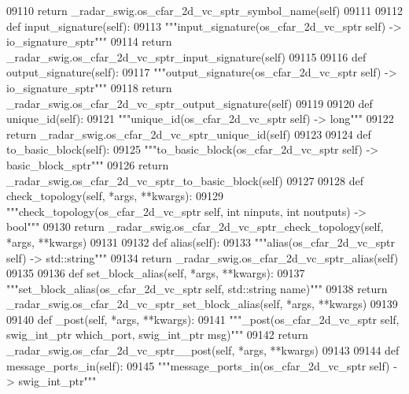 \begin{DoxyCode}
{{{{{{{{{{{{{{{{{{{{{{{{{{{{{09110         \textcolor{keywordflow}{return} \_radar\_swig.os\_cfar\_2d\_vc\_sptr\_symbol\_name(self)
09111 
09112     \textcolor{keyword}{def }input_signature(self):
09113         \textcolor{stringliteral}{"""input\_signature(os\_cfar\_2d\_vc\_sptr self) -> io\_signature\_sptr"""}
09114         \textcolor{keywordflow}{return} \_radar\_swig.os\_cfar\_2d\_vc\_sptr\_input\_signature(self)
09115 
09116     \textcolor{keyword}{def }output_signature(self):
09117         \textcolor{stringliteral}{"""output\_signature(os\_cfar\_2d\_vc\_sptr self) -> io\_signature\_sptr"""}
09118         \textcolor{keywordflow}{return} \_radar\_swig.os\_cfar\_2d\_vc\_sptr\_output\_signature(self)
09119 
09120     \textcolor{keyword}{def }unique_id(self):
09121         \textcolor{stringliteral}{"""unique\_id(os\_cfar\_2d\_vc\_sptr self) -> long"""}
09122         \textcolor{keywordflow}{return} \_radar\_swig.os\_cfar\_2d\_vc\_sptr\_unique\_id(self)
09123 
09124     \textcolor{keyword}{def }to_basic_block(self):
09125         \textcolor{stringliteral}{"""to\_basic\_block(os\_cfar\_2d\_vc\_sptr self) -> basic\_block\_sptr"""}
09126         \textcolor{keywordflow}{return} \_radar\_swig.os\_cfar\_2d\_vc\_sptr\_to\_basic\_block(self)
09127 
09128     \textcolor{keyword}{def }check_topology(self, *args, **kwargs):
09129         \textcolor{stringliteral}{"""check\_topology(os\_cfar\_2d\_vc\_sptr self, int ninputs, int noutputs) -> bool"""}
09130         \textcolor{keywordflow}{return} \_radar\_swig.os\_cfar\_2d\_vc\_sptr\_check\_topology(self, *args, **kwargs)
09131 
09132     \textcolor{keyword}{def }alias(self):
09133         \textcolor{stringliteral}{"""alias(os\_cfar\_2d\_vc\_sptr self) -> std::string"""}
09134         \textcolor{keywordflow}{return} \_radar\_swig.os\_cfar\_2d\_vc\_sptr\_alias(self)
09135 
09136     \textcolor{keyword}{def }set_block_alias(self, *args, **kwargs):
09137         \textcolor{stringliteral}{"""set\_block\_alias(os\_cfar\_2d\_vc\_sptr self, std::string name)"""}
09138         \textcolor{keywordflow}{return} \_radar\_swig.os\_cfar\_2d\_vc\_sptr\_set\_block\_alias(self, *args, **kwargs)
09139 
09140     \textcolor{keyword}{def }_post(self, *args, **kwargs):
09141         \textcolor{stringliteral}{"""\_post(os\_cfar\_2d\_vc\_sptr self, swig\_int\_ptr which\_port, swig\_int\_ptr msg)"""}
09142         \textcolor{keywordflow}{return} \_radar\_swig.os\_cfar\_2d\_vc\_sptr\_\_post(self, *args, **kwargs)
09143 
09144     \textcolor{keyword}{def }message_ports_in(self):
09145         \textcolor{stringliteral}{"""message\_ports\_in(os\_cfar\_2d\_vc\_sptr self) -> swig\_int\_ptr"""}
}}}}}}}}}}}}}}}}}}}}}}}}}}}}}
\end{DoxyCode}
